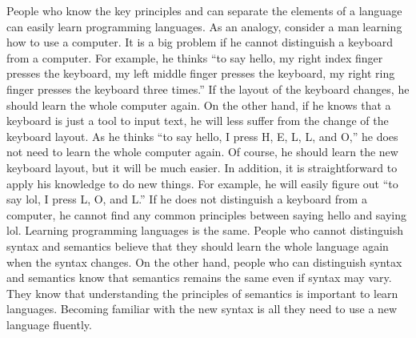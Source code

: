 People who know the key principles and can separate the elements of a language
can easily learn programming languages. As an analogy, consider a man learning
how to use a computer. It is a big problem if he cannot distinguish a keyboard
from a computer. For example, he thinks ``to say hello, my right index finger
presses the keyboard, my left middle finger presses the keyboard, my right ring
finger presses the keyboard three times.'' If the layout of the keyboard changes,
he should learn the whole computer again. On the other hand, if he knows that a
keyboard is just a tool to input text, he will less suffer from the change of
the keyboard layout. As he thinks ``to say hello, I press H, E, L, L, and O,'' he
does not need to learn the whole computer again. Of course, he should learn the
new keyboard layout, but it will be much easier. In addition, it is
straightforward to apply his knowledge to do new things. For example, he will
easily figure out ``to say lol, I press L, O, and L.'' If he does not distinguish
a keyboard from a computer, he cannot find any common principles between saying
hello and saying lol. Learning programming languages is the same. People who
cannot distinguish syntax and semantics believe that they should learn the whole
language again when the syntax changes. On the other hand, people who can
distinguish syntax and semantics know that semantics remains the same even if
syntax may vary. They know that understanding the principles of semantics is
important to learn languages. Becoming familiar with the
new syntax is all they need to use a new language fluently.

